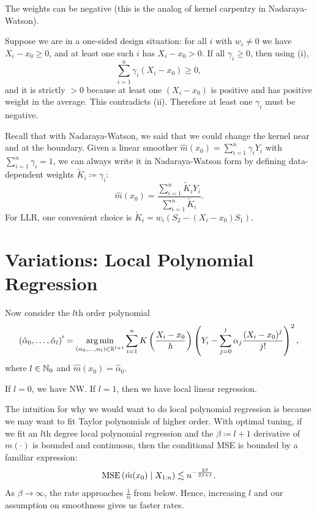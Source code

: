 \begin{remark}	The weights can be negative (this is the analog of kernel carpentry in Nadaraya-Watson).

	Suppose we are in a one-sided design situation: for all $i$ with $w_i \ne 0$ we have $X_i-x_0 \ge 0$, and at least one such $i$ has $X_i-x_0>0$.
	If all $\gamma_i \ge 0$, then using (i),
	\[
	\sum\limits_{i=1}^n \gamma_i (X_i-x_0) \ge 0,
	\]
	and it is strictly $>0$ because at least one $(X_i-x_0)$ is positive and has positive weight in the average. This contradicts (ii). Therefore at least one $\gamma_i$ must be negative.
\end{remark}

Recall that with Nadaraya-Watson, we said that we could change the kernel near and at the boundary. Given a linear smoother $\hat{m}(x_0)=\sum\limits_{i=1}^{n} \gamma_i Y_i$ with $\sum\limits_{i=1}^{n}\gamma_i=1$, we can always write it in Nadaraya-Watson form by defining data-dependent weights $\tilde{K}_i \coloneqq \gamma_i$:
\[
	\hat{m}(x_0)=\frac{\sum\limits_{i=1}^{n} \tilde{K}_i Y_i}{\sum\limits_{i=1}^{n} \tilde{K}_i}
.\]
For LLR, one convenient choice is $\tilde{K}_i = w_i\left(S_2-(X_i-x_0)S_1\right)$.

\section{Variations: Local Polynomial Regression}



Now consider the $l$th order polynomial \[
\left( \hat{\alpha}_0,\ldots,\hat{\alpha}_l \right)'
= \operatorname*{arg\,min}_{(\alpha_0,\ldots,\alpha_l)\in\mathbb{R}^{l+1}}
\sum\limits_{i=1}^{n} K\left( \frac{X_i-x_0}{h} \right)
\left( Y_i - \sum\limits_{j=0}^{l} \alpha_j \frac{\left( X_i-x_0 \right)^{j}}{j!} \right)^2
,\]
where $l \in \mathbb{N}_0$ and $\hat{m}(x_0) = \hat{\alpha}_0$.

\begin{example}	If $l=0$, we have NW. If $l=1$, then we have local linear regression.
\end{example}

The intuition for why we would want to do local polynomial regression is because we may want to fit Taylor polynomials of higher order. With optimal tuning, if we fit an $l$th degree local polynomial regression and the $\beta \coloneqq l+1$ derivative of $m(\cdot )$ is bounded and continuous, then the conditional MSE is bounded by a familiar expression: \[
	\operatorname{MSE}\left( \hat{m}(x_0) \mid X_{1:n} \right) \lesssim n^{- \frac{2\beta}{2\beta + 1}}
.\] As $\beta \to \infty$, the rate approaches $\frac{1}{n}$ from below. Hence, increasing $l$ and our assumption on smoothness gives us faster rates.

